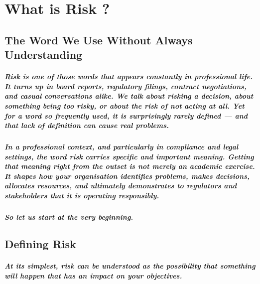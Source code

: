 \chapter{What is Risk ?}
\label{chap:What is Risk}

\section{The Word We Use Without Always Understanding}

\paragraph{Risk is one of those words that appears constantly in professional life. It turns up in board reports, regulatory filings, contract negotiations, and casual conversations alike. We talk about risking a decision, about something being too risky, or about the risk of not acting at all. Yet for a word so frequently used, it is surprisingly rarely defined — and that lack of definition can cause real problems.}

\paragraph{In a professional context, and particularly in compliance and legal settings, the word risk carries specific and important meaning. Getting that meaning right from the outset is not merely an academic exercise. It shapes how your organisation identifies problems, makes decisions, allocates resources, and ultimately demonstrates to regulators and stakeholders that it is operating responsibly.}

\paragraph{So let us start at the very beginning.}

\section{Defining Risk}

\paragraph{At its simplest, risk can be understood as the possibility that something will happen that has an impact on your objectives.}

